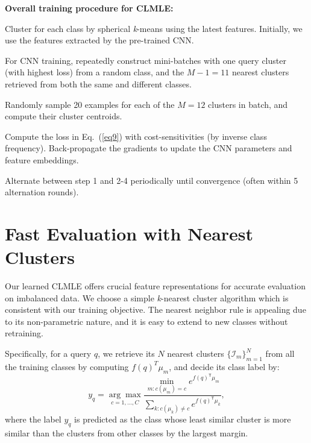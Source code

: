 \documentclass[10pt,journal,compsoc]{IEEEtran}
\newenvironment{packed_enumerate}{
\begin{enumerate}
  \setlength{\itemsep}{1pt}
  \setlength{\parskip}{0pt}
  \setlength{\parsep}{0pt}
}{\end{enumerate}}
\newcommand{\trans}[1]{{#1}^{\ensuremath{\mathsf{T}}}} %
\begin{document}
\vspace{0.5em}

\noindent
{\bf Overall training procedure for CLMLE:}
\vspace{-0.3em}
\begin{packed_enumerate}
  \item Cluster for each class by spherical \textit{k}-means using the latest features. Initially, we use the features extracted by the pre-trained CNN.
  \item For CNN training, repeatedly construct mini-batches with one query cluster (with highest loss) from a random class, and the $M-1=11$ nearest clusters retrieved from both the same and different classes.
  \item Randomly sample 20 examples for each of the $M=12$ clusters in batch, and compute their cluster centroids.
  \item Compute the loss in Eq.~(\ref{eq9}) with cost-sensitivities (by inverse class frequency). Back-propagate the gradients to update the CNN parameters and feature embeddings.
  \item Alternate between step 1 and 2-4 periodically until convergence (often within 5 alternation rounds).
\end{packed_enumerate}

\section{Fast Evaluation with Nearest Clusters}

Our learned CLMLE offers crucial feature representations for accurate evaluation on imbalanced data. We choose a simple \textit{k}-nearest cluster algorithm which is consistent with our training objective. The nearest neighbor rule is appealing due to its non-parametric nature, and it is easy to extend to new classes without retraining.

Specifically, for a query $q$, we retrieve its $N$ nearest clusters $\{\mathcal{I}_m\}_{m=1}^{N}$ from all the training classes by computing $f(q)^T \mu_m$, and decide its class label by:
\begin{equation}
\label{eq10}
y_q= \underset{c=1,\ldots,C}{\arg\max} \frac{\underset{m:c(\mu_m)=c}{\min} e^{\trans{f(q)} \mu_m}} {\sum_{k:c(\mu_k) \ne c} e^{\trans{f(q)} \mu_k}},
\end{equation}
where the label $y_q$ is predicted as the class whose least similar cluster is more similar than the clusters from other classes by the largest margin.
\end{document}
